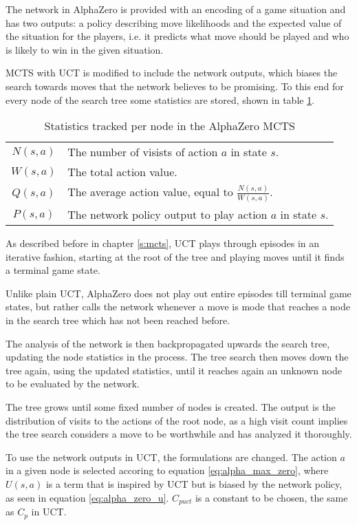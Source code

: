 \documentclass[12pt,onecolumn,oneside,titlepage]{article}
\begin{document}
The network in AlphaZero is provided with an encoding of a game situation and has two outputs: a policy describing move likelihoods and the expected value of the situation for the players, i.e. it predicts what move should be played and who is likely to win in the given situation.

MCTS with UCT is modified to include the network outputs, which biases the search towards moves that the network believes to be promising.
To this end for every node of the search tree some statistics are stored, shown in table \ref{t:mcts_stats_values}.

\begin{table} [H]
 \centering
  \begin{tabular}{ c l }
  $N(s,a)$ & The number of visists of action $a$ in state $s$. \\ 
  $W(s,a)$ & The total action value. \\  
  $Q(s, a)$ & The average action value, equal to $\frac{N(s,a)}{W(s,a)}$. \\
  $P(s,a)$ & The network policy output to play action $a$ in state $s$.
  \end{tabular}
  \caption{Statistics tracked per node in the AlphaZero MCTS}
  \label{t:mcts_stats_values}
\end{table}

As described before in chapter \ref{s:mcts}, UCT plays through episodes in an iterative fashion, starting at the root of the tree and playing moves until it finds a terminal game state.

Unlike plain UCT, AlphaZero does not play out entire episodes till terminal game states, but rather calls the network whenever a move is mode that reaches a node in the search tree which has not been reached before.

The analysis of the network is then backpropagated upwards the search tree, updating the node statistics in the process. The tree search then moves down the tree again, using the updated statistics, until it reaches again an unknown node to be evaluated by the network.

The tree grows until some fixed number of nodes is created. The output is the distribution of visits to the actions of the root node, as a high visit count implies the tree search considers a move to be worthwhile and has analyzed it thoroughly.

To use the network outputs in UCT, the formulations are changed. The action $a$ in a given node is selected accoring to equation \ref{eq:alpha_max_zero}, where $U(s,a)$ is a term that is inspired by UCT but is biased by the network policy, as seen in equation \ref{eq:alpha_zero_u}.
$C_{puct}$ is a constant to be chosen, the same as $C_p$ in UCT.
\end{document}
